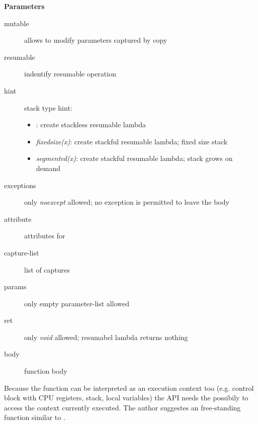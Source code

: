 {\bf Parameters}
\begin{description}
    \item[mutable]      allows to modify parameters captured by copy
    \item[resumable]    indentify resumable operation
    \item[hint]         stack type hint:
                        \begin{itemize}
                            \item <no hint specified>: create stackless resumable lambda
                            \item \textit{fixedsize(x)}: create stackful resumable lambda; fixed size stack
                            \item \textit{segmented(x)}: create stackful resumable lambda; stack grows on demand
                        \end{itemize}
    \item[exceptions]   only \textit{noexcept} allowed; no exception is permitted to leave the body
    \item[attribute]    attributes for 
    \item[capture-list] list of captures
    \item[params]       only empty parameter-list allowed
    \item[ret]          only \textit{void} allowed; resumabel lambda returns nothing
    \item[body]         function body\\
\end{description}

Because the function  can be interpreted as an execution context too
(e.g. control block with CPU registers, stack, local variables) the API needs
the possibily to access the context currently executed. The author suggestes an
free-standing function similar to .
